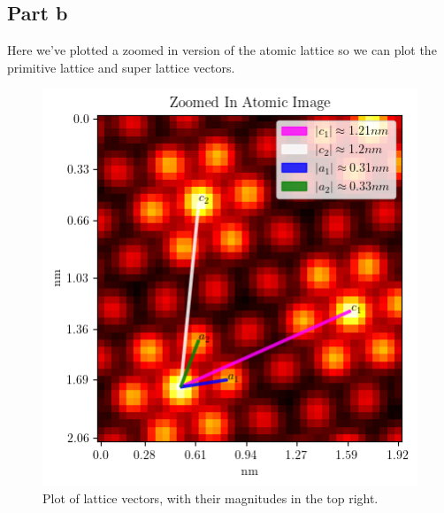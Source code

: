 \subsection*{Part b}
Here we've plotted a zoomed in version of the atomic lattice so we can plot the primitive lattice and super lattice vectors.
\begin{figure}[H]
    \centering
    \includegraphics[width=1\linewidth]{Resources//140A//Homework 6/140A Homework 6 Problem 5b.png}
    \caption{Plot of lattice vectors, with their magnitudes in the top right.}
    \label{fig:enter-label}
\end{figure}

